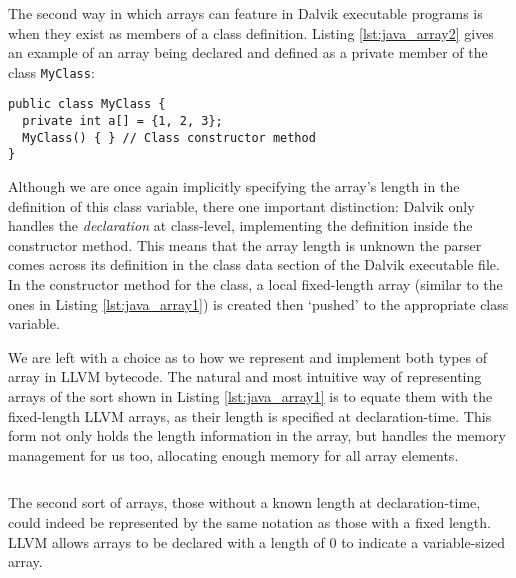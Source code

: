 The second way in which arrays can feature in Dalvik executable programs is when they exist as members of a class definition. Listing \ref{lst:java_array2} gives an example of an array being declared and defined as a private member of the class \verb|MyClass|:

\begin{lstlisting}[frame=single, caption={Arrays as class members in Java}, label={lst:java_array2}]
public class MyClass {
  private int a[] = {1, 2, 3};
  MyClass() { } // Class constructor method
}
\end{lstlisting}

Although we are once again implicitly specifying the array's length in the definition of this class variable, there one important distinction: Dalvik only handles the \textit{declaration} at class-level, implementing the definition inside the constructor method. This means that the array length is unknown the parser comes across its definition in the class data section of the Dalvik executable file. In the constructor method for the class, a local fixed-length array (similar to the ones in Listing \ref{lst:java_array1}) is created then `pushed' to the appropriate class variable.

We are left with a choice as to how we represent and implement both types of array in LLVM bytecode. The natural and most intuitive way of representing arrays of the sort shown in Listing \ref{lst:java_array1} is to equate them with the fixed-length LLVM arrays, as their length is specified at declaration-time. This form not only holds the length information in the array, but handles the memory management for us too, allocating enough memory for all array elements.

\lstset{
	language=Assembly,
	basicstyle=\small,
	stringstyle=\ttfamily
}

\begin{lstlisting}[frame=single, caption={LLVM fixed-length array}, label=lst:llvm_fix]
%a = [3 x i32]
\end{lstlisting}

The second sort of arrays, those without a known length at declaration-time, could indeed be represented by the same notation as those with a fixed length. LLVM allows arrays to be declared with a length of 0 to indicate a variable-sized array.

\begin{lstlisting}[frame=single, caption={LLVM variable-length array}, label=lst:llvm_var]
%a = [0 x i32]
\end{lstlisting}


